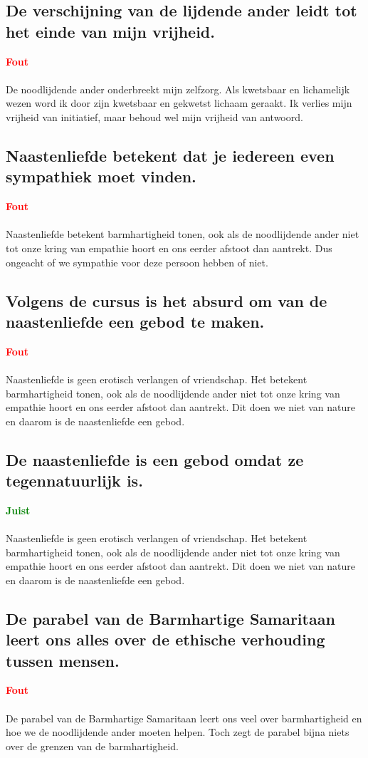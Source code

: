 \documentclass[11pt,a4paper,titlepage]{article}
\begin{document}
\subsection{De verschijning van de lijdende ander leidt tot het einde van mijn vrijheid.}
\textcolor{red}{\textbf{Fout}}\\\\
De noodlijdende ander onderbreekt mijn zelfzorg. Als kwetsbaar en lichamelijk wezen word ik door zijn kwetsbaar en gekwetst lichaam geraakt. Ik verlies mijn
vrijheid van initiatief, maar behoud wel mijn vrijheid van antwoord.

\subsection{Naastenliefde betekent dat je iedereen even sympathiek moet vinden.}
\textcolor{red}{\textbf{Fout}}\\\\
Naastenliefde betekent barmhartigheid tonen, ook als de noodlijdende ander niet tot onze kring van empathie hoort en ons eerder afstoot dan aantrekt. Dus ongeacht of we sympathie voor deze persoon hebben of niet.

\subsection{Volgens de cursus is het absurd om van de naastenliefde een gebod te maken.}
\textcolor{red}{\textbf{Fout}}\\\\
Naastenliefde is geen erotisch verlangen of vriendschap. Het betekent barmhartigheid tonen, ook als de noodlijdende ander niet tot onze kring van empathie hoort en ons eerder afstoot dan aantrekt. Dit doen we niet van nature en daarom is de naastenliefde een gebod.

\subsection{De naastenliefde is een gebod omdat ze tegennatuurlijk is.}
\textcolor{green}{\textbf{Juist}}\\\\
Naastenliefde is geen erotisch verlangen of vriendschap. Het betekent barmhartigheid tonen, ook als de noodlijdende ander niet tot onze kring van empathie hoort en ons eerder afstoot dan aantrekt. Dit doen we niet van nature en daarom is de naastenliefde een gebod.

\subsection{De parabel van de Barmhartige Samaritaan leert ons alles over de ethische verhouding tussen mensen.}
\textcolor{red}{\textbf{Fout}}\\\\
De parabel van de Barmhartige Samaritaan leert ons veel over barmhartigheid en hoe we de noodlijdende ander moeten helpen. Toch zegt de parabel bijna niets over de grenzen van de barmhartigheid.
\end{document}
